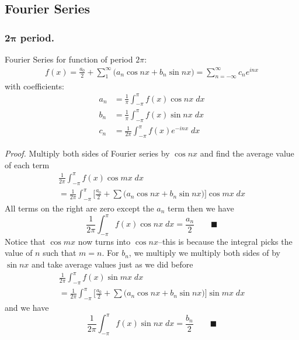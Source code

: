 \documentclass[../../../main.tex]{subfiles}
\begin{document}
\subsection{Fourier Series}
\subsubsection{2$\boldsymbol{\pi}$ period.} Fourier Series for function of period $2\pi$:
\begin{align*}
    f(x)=\frac{a_0}{2}+\sum_{1}^{\infty}\bigg(a_n\cos nx +b_n\sin nx\bigg)=\sum_{n=-\infty}^{\infty}c_n e^{inx}
\end{align*}
with coefficients:
\begin{align*}
    a_n & =\frac{1}{\pi}\int_{-\pi}^{\pi}  f(x)\cos nx\; dx   \\
    b_n & =\frac{1}{\pi}\int_{-\pi}^{\pi}  f(x)\sin nx \;dx   \\
    c_n & =\frac{1}{2\pi}\int_{-\pi}^{\pi}  f(x)e^{-inx} \;dx
\end{align*}

\emph{Proof.} Multiply both sides of Fourier series by $\cos nx$ and ﬁnd the average value of each term
\begin{multline*}
    \frac{1}{2\pi}\int_{-\pi}^{\pi}f(x)\cos mx \;dx\\=\frac{1}{2\pi}\int_{-\pi}^{\pi}\bigg[ \frac{a_0}{2} +\sum  \big(a_n\cos nx + b_n\sin nx\big) \bigg]\cos mx \;dx
\end{multline*}
All terms on the right are zero except the $a_n$ term then we have
\begin{equation*}
    \frac{1}{2\pi}\int_{-\pi}^{\pi}f(x)\cos nx \;dx=\frac{a_n}{2} \qquad\blacksquare
\end{equation*}
Notice that $\cos mx$ now turns into $\cos nx$--this is because the integral picks the value of $n$ such that $m=n$. For $b_n$, we multiply we multiply both sides of by $\sin nx$ and take average values just as we did before
\begin{multline*}
    \frac{1}{2\pi}\int_{-\pi}^{\pi}f(x)\sin mx \;dx\\=\frac{1}{2\pi}\int_{-\pi}^{\pi}\bigg[ \frac{a_0}{2} +\sum  \big(a_n\cos nx + b_n\sin nx\big) \bigg]\sin mx \;dx
\end{multline*}
and we have
\begin{equation*}
    \frac{1}{2\pi}\int_{-\pi}^{\pi}f(x)\sin nx \;dx=\frac{b_n}{2} \qquad\blacksquare
\end{equation*}
\end{document}
